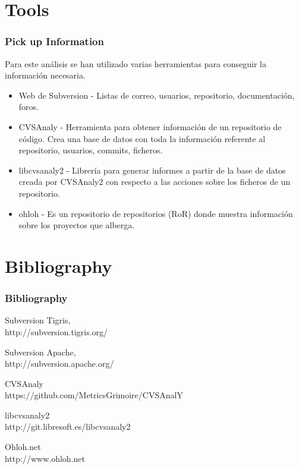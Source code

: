\documentclass[xcolor=dvipsnames]{beamer}
\begin{document}
\section{Tools}
\begin{frame}[allowframebreaks]
\frametitle{Pick up Information}

\par Para este an\'alisis se han utilizado varias herramientas para conseguir la informaci\'on necesaria.

\begin{itemize}
    \item Web de Subversion - Listas de correo, usuarios, repositorio, documentaci\'on, foros.
    \item CVSAnaly - Herramienta para obtener informaci\'on de un repositorio de c\'odigo. Crea una base de datos con toda la informaci\'on referente al repositorio, usuarios, commits, ficheros.
    \item libcvsanaly2 - Librer\'ia para generar informes a partir de la base de datos creada por CVSAnaly2 con respecto a las acciones sobre los ficheros de un repositorio.
    \item ohloh - Es un repositorio de repositorios (RoR) donde muestra informaci\'on sobre los proyectos que alberga.

\end{itemize}

\end{frame}

\section{Bibliography}
\begin{frame}[allowframebreaks]
\frametitle{Bibliography}
\begin{thebibliography}{9}

  Subversion Tigris,\\
  http://subversion.tigris.org/

  Subversion Apache,\\
  http://subversion.apache.org/

    CVSAnaly\\
    https://github.com/MetricsGrimoire/CVSAnalY

    libcvsanaly2\\
    http://git.libresoft.es/libcvsanaly2

    Ohloh.net\\
    http://www.ohloh.net

\end{thebibliography}
\end{frame}
\end{document}
